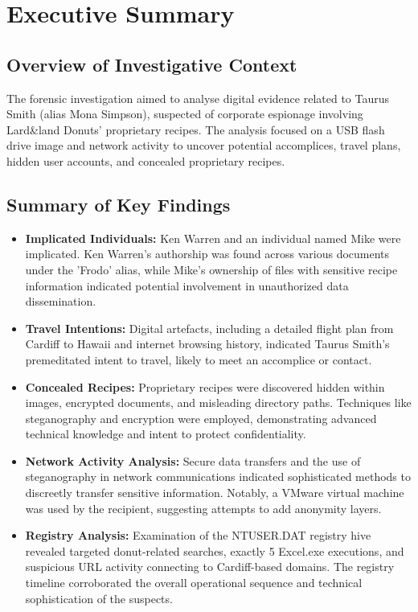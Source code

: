 \chapter*{Executive Summary}

\section*{Overview of Investigative Context}

The forensic investigation aimed to analyse digital evidence related to Taurus Smith (alias Mona Simpson), suspected of corporate espionage involving Lard\&land Donuts' proprietary recipes. The analysis focused on a USB flash drive image and network activity to uncover potential accomplices, travel plans, hidden user accounts, and concealed proprietary recipes.

\section*{Summary of Key Findings}

\begin{itemize}
    \item \textbf{Implicated Individuals:} Ken Warren and an individual named Mike were implicated. Ken Warren's authorship was found across various documents under the 'Frodo' alias, while Mike's ownership of files with sensitive recipe information indicated potential involvement in unauthorized data dissemination.
    
    \item \textbf{Travel Intentions:} Digital artefacts, including a detailed flight plan from Cardiff to Hawaii and internet browsing history, indicated Taurus Smith's premeditated intent to travel, likely to meet an accomplice or contact.
    
    \item \textbf{Concealed Recipes:} Proprietary recipes were discovered hidden within images, encrypted documents, and misleading directory paths. Techniques like steganography and encryption were employed, demonstrating advanced technical knowledge and intent to protect confidentiality.
    
    \item \textbf{Network Activity Analysis:} Secure data transfers and the use of steganography in network communications indicated sophisticated methods to discreetly transfer sensitive information. Notably, a VMware virtual machine was used by the recipient, suggesting attempts to add anonymity layers.
    
    \item \textbf{Registry Analysis:} Examination of the NTUSER.DAT registry hive revealed targeted donut-related searches, exactly 5 Excel.exe executions, and suspicious URL activity connecting to Cardiff-based domains. The registry timeline corroborated the overall operational sequence and technical sophistication of the suspects.
\end{itemize}

